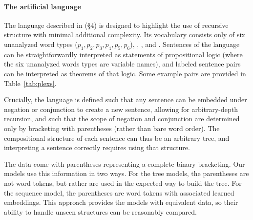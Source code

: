 \paragraph{The artificial language} The language described in  (\S4) is designed to highlight the use of recursive structure with minimal additional complexity. Its vocabulary consists only of six unanalyzed word types ($p_1, p_2, p_3, p_4, p_5, p_6$), , , and . Sentences of the language can be straightforwardly interpreted as statements of propositional logic (where the six unanalyzed words types are variable names), and labeled sentence pairs can be interpreted as theorems of that logic. Some example pairs are provided in Table~\ref{tab:plexs}.

Crucially, the language is defined such that any sentence can be embedded under negation or conjunction to create a new sentence, allowing for arbitrary-depth recursion, and such that the scope of negation and conjunction are determined only by bracketing with parentheses (rather than bare word order). The compositional structure of each sentence can thus be an arbitrary tree, and interpreting a sentence correctly requires using that structure.

The data come with parentheses representing a complete binary bracketing. Our models use this information in two ways. For the tree models, the parentheses are not word tokens, but rather are used in the expected way to build the tree. For the sequence model, the parentheses are word tokens with associated learned embeddings. This approach provides the models with equivalent data, so their ability to handle unseen structures can be reasonably compared.

